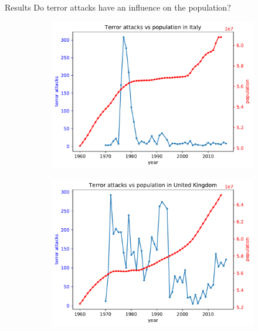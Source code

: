 \documentclass{beamer}
\begin{document}
\begin{frame}{Results}
	Do terror attacks have an influence on the population?
	
	\begin{figure}
		\begin{subfigure}[b]{0.315\textwidth}
			\includegraphics[width=\textwidth]{Population-Terror/attackVsPopulationItaly}
		\end{subfigure}
		\begin{subfigure}[b]{0.3\textwidth}
			\includegraphics[width=\textwidth]{Population-Terror/attackVsPopulationUnitedKingdom}
		\end{subfigure}
		\begin{subfigure}[b]{0.3\textwidth}

\end{subfigure}
\end{figure}
\end{frame}
\end{document}

